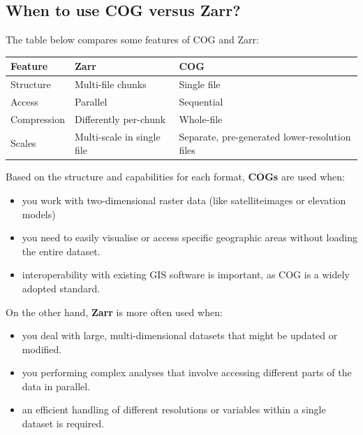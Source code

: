 \documentclass[
  letterpaper,
  DIV=11,
  numbers=noendperiod]{scrreprt}
\providecommand{\tightlist}{%
  \setlength{\itemsep}{0pt}\setlength{\parskip}{0pt}}
\begin{document}
\subsection{When to use COG versus
Zarr?}\label{when-to-use-cog-versus-zarr}

The table below compares some features of COG and Zarr:

\begin{longtable}[]{@{}
  >{\raggedright\arraybackslash}p{}
  >{\raggedright\arraybackslash}p{}
  >{\raggedright\arraybackslash}p{}@{}}
\toprule\noalign{}
\begin{minipage}[b]{\linewidth}\raggedright
Feature
\end{minipage} & \begin{minipage}[b]{\linewidth}\raggedright
Zarr
\end{minipage} & \begin{minipage}[b]{\linewidth}\raggedright
COG
\end{minipage} \\
\midrule\noalign{}
\endhead
\bottomrule\noalign{}
\endlastfoot
Structure & Multi-file chunks & Single file \\
Access & Parallel & Sequential \\
Compression & Differently per-chunk & Whole-file \\
Scales & Multi-scale in single file & Separate, pre-generated
lower-resolution files \\
\end{longtable}

Based on the structure and capabilities for each format, \textbf{COGs}
are used when:

\begin{itemize}
\tightlist
\item
  you work with two-dimensional raster data (like satelliteimages or
  elevation models)
\item
  you need to easily visualise or access specific geographic areas
  without loading the entire dataset.
\item
  interoperability with existing GIS software is important, as COG is a
  widely adopted standard.
\end{itemize}

On the other hand, \textbf{Zarr} is more often used when:

\begin{itemize}
\tightlist
\item
  you deal with large, multi-dimensional datasets that might be updated
  or modified.
\item
  you performing complex analyses that involve accessing different parts
  of the data in parallel.
\item
  an efficient handling of different resolutions or variables within a
  single dataset is required.
\end{itemize}
\end{document}
